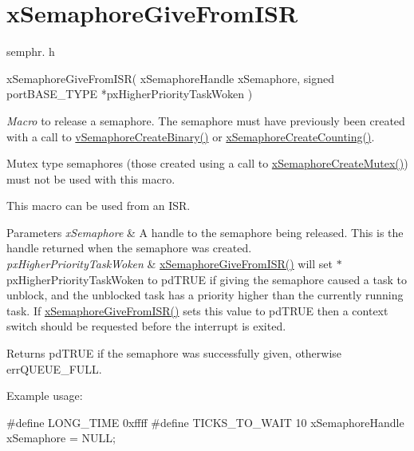 \hypertarget{group__x_semaphore_give_from_i_s_r}{}\section{x\+Semaphore\+Give\+From\+I\+SR}
\label{group__x_semaphore_give_from_i_s_r}
semphr. h 
\begin{DoxyPre}
xSemaphoreGiveFromISR( 
                         xSemaphoreHandle xSemaphore, 
                         signed portBASE\_TYPE *pxHigherPriorityTaskWoken
                     )\end{DoxyPre}


{\itshape Macro} to release a semaphore. The semaphore must have previously been created with a call to \mbox{\hyperlink{semphr_8h_ae10bffadd26fbd5bcce76bf33a83ef30}{v\+Semaphore\+Create\+Binary()}} or \mbox{\hyperlink{semphr_8h_a7764616a918a46115403569a88148ad4}{x\+Semaphore\+Create\+Counting()}}.

Mutex type semaphores (those created using a call to \mbox{\hyperlink{semphr_8h_aa6a00aa9b91a9e5b3ebe4ae1c3f115c6}{x\+Semaphore\+Create\+Mutex()}}) must not be used with this macro.

This macro can be used from an I\+SR.


\begin{DoxyParams}{Parameters}
{\em x\+Semaphore} & A handle to the semaphore being released. This is the handle returned when the semaphore was created.\\
\hline
{\em px\+Higher\+Priority\+Task\+Woken} & \mbox{\hyperlink{semphr_8h_a68aa43df8b2a0dbe17d05fad74670ef0}{x\+Semaphore\+Give\+From\+I\+S\+R()}} will set $\ast$px\+Higher\+Priority\+Task\+Woken to pd\+T\+R\+UE if giving the semaphore caused a task to unblock, and the unblocked task has a priority higher than the currently running task. If \mbox{\hyperlink{semphr_8h_a68aa43df8b2a0dbe17d05fad74670ef0}{x\+Semaphore\+Give\+From\+I\+S\+R()}} sets this value to pd\+T\+R\+UE then a context switch should be requested before the interrupt is exited.\\
\hline
\end{DoxyParams}
\begin{DoxyReturn}{Returns}
pd\+T\+R\+UE if the semaphore was successfully given, otherwise err\+Q\+U\+E\+U\+E\+\_\+\+F\+U\+LL.
\end{DoxyReturn}
Example usage\+: 
\begin{DoxyPre}
\#define LONG\_TIME 0xffff
\#define TICKS\_TO\_WAIT  10
xSemaphoreHandle xSemaphore = NULL;\end{DoxyPre}



